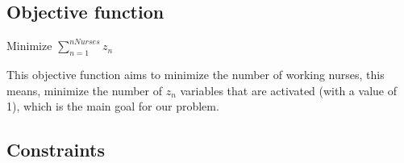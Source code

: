 \subsection{Objective function}
\begin{center}
Minimize $ \sum\limits_{n=1}^{nNurses} z_{n}  $ \\
\end{center}

This objective function aims to minimize the number of working nurses, this means, minimize the number of $z_n$ variables that are activated (with a value of 1), which is the main goal for our problem.

\pagebreak

\subsection{Constraints}

